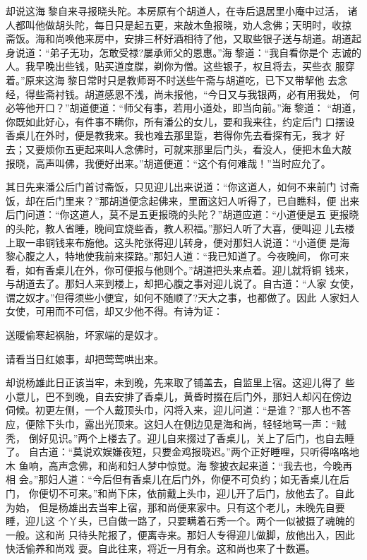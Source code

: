 却说这海黎自来寻报晓头陀。本房原有个胡道人，在寺后退居里小庵中过活，
诸人都叫他做胡头陀，每日只是起五更，来敲木鱼报晓，劝人念佛；天明时，收掠
斋饭。海和尚唤他来房中，安排三杯好酒相待了他，又取些银子送与胡道。胡道起
身说道：“弟子无功，怎敢受禄?屡承师父的恩惠。”海黎道：“我自看你是个
志诚的人。我早晚出些钱，贴买道度牒，剃你为僧。这些银子，权且将去，买些衣
服穿着。”原来这海黎日常时只是教师哥不时送些午斋与胡道吃，已下又带挈他
去念经，得些斋衬钱。胡道感恩不浅，尚未报他，“今日又与我银两，必有用我处，
何必等他开口？”胡道便道：“师父有事，若用小道处，即当向前。”海黎道：
“胡道，你既如此好心，有件事不瞒你，所有潘公的女儿，要和我来往，约定后门
口摆设香桌儿在外时，便是教我来。我也难去那里踅，若得你先去看探有无，我才
好去；又要烦你五更起来叫人念佛时，可就来那里后门头，看没人，便把木鱼大敲
报晓，高声叫佛，我便好出来。”胡道便道：“这个有何难哉！”当时应允了。

其日先来潘公后门首讨斋饭，只见迎儿出来说道：“你这道人，如何不来前门
讨斋饭，却在后门里来？”那胡道便念起佛来，里面这妇人听得了，已自瞧科，便
出来后门问道：“你这道人，莫不是五更报晓的头陀？”胡道应道：“小道便是五
更报晓的头陀，教人省睡，晚间宜烧些香，教人积福。”那妇人听了大喜，便叫迎
儿去楼上取一串铜钱来布施他。这头陀张得迎儿转身，便对那妇人说道：“小道便
是海黎心腹之人，特地使我前来探路。”那妇人道：“我已知道了。今夜晚间，
你可来看，如有香桌儿在外，你可便报与他则个。”胡道把头来点着。迎儿就将铜
钱来，与胡道去了。那妇人来到楼上，却把心腹之事对迎儿说了。自古道：“人家
女使，谓之奴才。”但得须些小便宜，如何不随顺了?天大之事，也都做了。因此
人家妇人女使，可用而不可信，却又少他不得。有诗为证：

送暖偷寒起祸胎，坏家端的是奴才。

请看当日红娘事，却把莺莺哄出来。

却说杨雄此日正该当牢，未到晚，先来取了铺盖去，自监里上宿。这迎儿得了
些小意儿，巴不到晚，自去安排了香桌儿，黄昏时掇在后门外，那妇人却闪在傍边
伺候。初更左侧，一个人戴顶头巾，闪将入来，迎儿问道：“是谁？”那人也不答
应，便除下头巾，露出光顶来。这妇人在侧边见是海和尚，轻轻地骂一声：“贼秃，
倒好见识。”两个上楼去了。迎儿自来掇过了香桌儿，关上了后门，也自去睡了。
自古道：“莫说欢娱嫌夜短，只要金鸡报晓迟。”两个正好睡哩，只听得咯咯地木
鱼响，高声念佛，和尚和妇人梦中惊觉。海黎披衣起来道：“我去也，今晚再相
会。”那妇人道：“今后但有香桌儿在后门外，你便不可负约；如无香桌儿在后门，
你便切不可来。”和尚下床，依前戴上头巾，迎儿开了后门，放他去了。自此为始，
但是杨雄出去当牢上宿，那和尚便来家中。只有这个老儿，未晚先自要睡，迎儿这
个丫头，已自做一路了，只要瞒着石秀一个。两个一似被摄了魂魄的一般。这和尚
只待头陀报了，便离寺来。那妇人专得迎儿做脚，放他出入，因此快活偷养和尚戏
耍。自此往来，将近一月有余。这和尚也来了十数遍。

